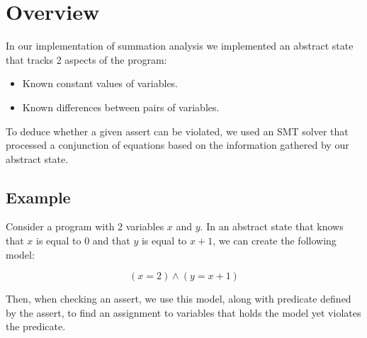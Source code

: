 \section*{Overview}
In our implementation of summation analysis we implemented an abstract state that tracks 2 aspects of the program:
\begin{itemize}
\item Known constant values of variables.
\item Known differences between pairs of variables.
\end{itemize}
To deduce whether a given assert can be violated, we used an SMT solver that processed a conjunction of equations based on the information gathered by our abstract state.

\subsection*{Example}
Consider a program with 2 variables $x$ and $y$. In an abstract state that knows that $x$ is equal to 0 and that $y$ is equal to $x+1$, we can create the following model:

\begin{equation*}
	(x = 2) \wedge (y = x + 1)
\end{equation*}

Then, when checking an assert, we use this model, along with predicate defined by the assert, to find an assignment to variables that holds the model yet violates the predicate.